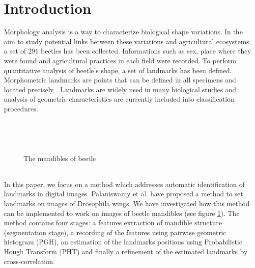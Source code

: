 \documentclass[twoside,twocolumn,10pt]{article}
\begin{document}


\section{Introduction}

\copyrightspace
Morphology analysis is a way to characterize biological shape
variations. In the aim to study potential links between these
variations and agricultural ecosystems, a set of $291$ beetles has
been collected. Informations such as sex, place where they were found
and agricultural practices in each field were recorded. To perform
quantitative analysis of beetle's shape, a set of landmarks has been
defined. Morphometric landmarks are points that can be defined in all
specimens and located precisely \cite{web2010}. Landmarks are widely
used in many biological studies and analysis of geometric
characteristics are currently included into classification procedures.

~\\
\begin{figure}[h!]
\centering
{}~~
\caption{The mandibles of beetle}
\label{fig:figure_11}
\end{figure}
\\
In this paper, we focus on a method which addresses automatic identification of
landmarks in digital images. Palaniswamy et
al. \cite{palaniswamy2010automatic} have proposed a method to set landmarks
on images of Drosophila wings. We have investigated how this method can be
implemented to work on images of beetle mandibles (see figure
\ref{fig:figure_11}). The method contains four stages: a features extraction of mandible
structure (segmentation stage), a recording of the features using pairwise
geometric histogram (PGH), an estimation of the landmarks positions using
Probabilistic Hough Transform (PHT) and finally a refinement of the estimated
landmarks by cross-correlation.
\end{document}

